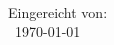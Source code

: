 \begin{titlepage}
\begin{large}
\begin{center}

\textbf{\hochschule\ \ort}\\[5pt]
\fachbereich\\
\studiengang\\

\vskip 1.5cm
{\huge\bfseries\textsf \titel \par}
{\large\bfseries\textsf \untertitel \par}
\vfill

Eingereicht von: \autor\\
\ort\ \today

\end{center}
\vfill

\end{large}
\end{titlepage}
